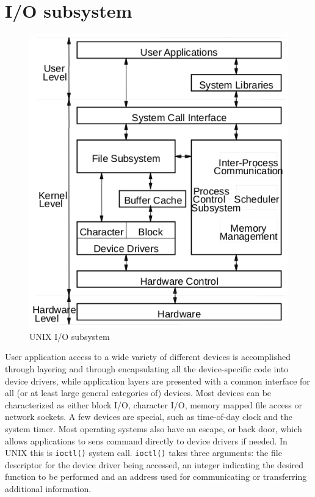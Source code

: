 \section{I/O subsystem}
\begin{figure}[hbtp]
\centering
\includegraphics[scale=0.4]{images/device_management/unix_io_subsystem.png}
\caption{UNIX I/O subsystem}
\end{figure}
User application access to a wide variety of different devices is accomplished through layering and through encapsulating all the device-specific code into device drivers, while application layers are presented with a common interface for all (or at least large general categories of) devices. Most devices can be characterized as either block I/O, character I/O, memory mapped file access or network sockets. A few devices are special, such as time-of-day clock and the system timer. Most operating systems also have an escape, or back door, which allows applications to sens command directly to device drivers if needed. In UNIX this is \texttt{ioctl()} system call. \texttt{ioctl()} takes three arguments: the file descriptor for the device driver being accessed, an integer indicating the desired function to be performed and an address used for communicating or transferring additional information.

